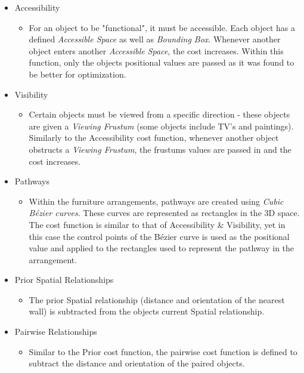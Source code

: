 \begin{itemize}
    \item Accessibility
        \begin{itemize}
            \item For an object to be "functional", it must be accessible. Each object has a defined \textit{Accessible Space} as well as \textit{Bounding Box}. Whenever another object enters another \textit{Accessible Space}, the cost increases. Within this function, only the objects positional values are passed as it was found to be better for optimization.
        \end{itemize}
    \item Visibility
        \begin{itemize}
            \item Certain objects must be viewed from a specific direction - these objects are given a \textit{Viewing Frustum} (some objects include TV's and paintings). Similarly to the Accessibility cost function, whenever another object obstructs a \textit{Viewing Frustum}, the frustums values are passed in and the cost increases.
        \end{itemize}
    \item Pathways
        \begin{itemize}
            \item Within the furniture arrangements, pathways are created using \textit{Cubic Bézier curves}. These curves are represented as rectangles in the 3D space. The cost function is similar to that of Accessibility \& Visibility, yet in this case the control points of the Bézier curve is used as the positional value and applied to the rectangles used to represent the pathway in the arrangement.
        \end{itemize}
    \item Prior Spatial Relationships
        \begin{itemize}
            \item The prior Spatial relationship (distance and orientation of the nearest wall) is subtracted from the objects current Spatial relationship.
        \end{itemize}
    \item Pairwise Relationships
        \begin{itemize}
            \item Similar to the Prior cost function, the pairwise cost function is defined to subtract the distance and orientation of the paired objects.
        \end{itemize}
\end{itemize}
